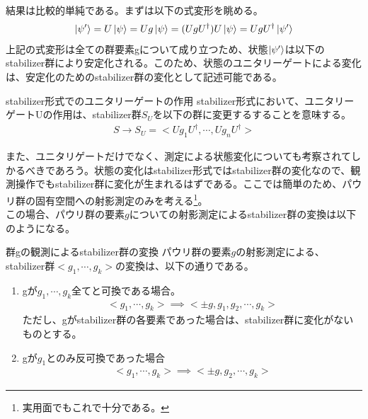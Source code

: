 \documentclass[a4paper,10.5pt]{article}
\numberwithin{equation}{section}
\begin{document}
\\
結果は比較的単純である。まずは以下の式変形を眺める。
\begin{align*}
    \ket{\psi'}=U\ket{\psi}=Ug\ket{\psi}=(UgU^{\dagger})U\ket{\psi}=UgU^{\dagger}\ket{\psi'}
\end{align*}
上記の式変形は全ての群要素gについて成り立つため、状態$\ket{\psi'}$は以下のstabilizer群により安定化される。このため、状態のユニタリーゲートによる変化は、安定化のためのstabilizer群の変化として記述可能である。
\begin{theorembox}{stabilizer形式でのユニタリーゲートの作用}
stabilizer形式において、ユニタリーゲートUの作用は、stabilizer群$S_{U}$を以下の群に変更するすることを意味する。
    \begin{align*}
    S\to S_{U}=<Ug_{1}U^{\dagger},\cdots ,Ug_{n}U^{\dagger}>
    \end{align*}
\end{theorembox}
また、ユニタリゲートだけでなく、測定による状態変化についても考察されてしかるべきであろう。状態の変化はstabilizer形式ではstabilizer群の変化なので、観測操作でもstabilizer群に変化が生まれるはずである。ここでは簡単のため、パウリ群の固有空間への射影測定のみを考える\footnote{実用面でもこれで十分である。}。\\
この場合、パウリ群の要素$g$についての射影測定によるstabilizer群の変換は以下のようになる。
\begin{resultbox}{群gの観測によるstabilizer群の変換}
パウリ群の要素$g$の射影測定による、stabilizer群$<g_{1},\cdots ,g_{k}>$の変換は、以下の通りである。
\begin{enumerate}
    \item gが$g_{1},\cdots ,g_{k}$全てと可換である場合。
    \begin{align*}
        <g_{1},\cdots ,g_{k}> \implies <\pm g,g_{1},g_{2},\cdots ,g_{k}>
    \end{align*}
    ただし、gがstabilizer群の各要素であった場合は、stabilizer群に変化がないものとする。\\
    \item gが$g_{1}$とのみ反可換であった場合
    \begin{align*}
        <g_{1},\cdots ,g_{k}> \implies <\pm g,g_{2},\cdots ,g_{k}>
    \end{align*}
\end{enumerate}
\end{resultbox}
\end{document}
